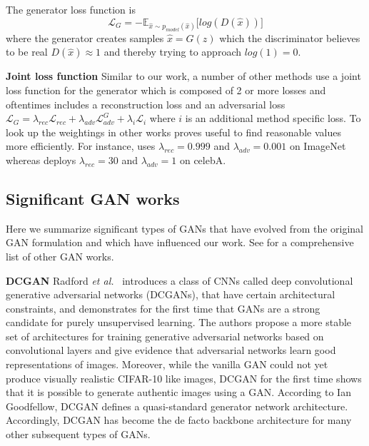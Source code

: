 \documentclass[a4paper,12pt]{report}
\begin{document}
The generator loss function is
\begin{equation} \label{eq:g_loss}
    \mathcal{L}_{G} = -\mathbb{E}_{\hat{x}\sim p_{model} (\hat{x})}\big[log(D(\hat{x}))\big]
\end{equation}
where the generator creates samples $\hat{x} = G(z)$ which the discriminator believes to be real $D(\hat{x}) \approx 1$ and thereby trying to approach $log(1) = 0$.

\par \textbf{Joint loss function}
Similar to our work, a number of other methods \cite{1511.05440,DisentFacOfVarByMixTh,1604.07379} use a joint loss function for the generator which is composed of 2 or more losses and oftentimes includes a reconstruction loss and an adversarial loss $\mathcal{L}_G = \lambda_{rec}\mathcal{L}_{rec} + \lambda_{adv}\mathcal{L}^G_{adv} + \lambda_{i}\mathcal{L}_{i}$ where $i$ is an additional method specific loss. To look up the weightings in other works proves useful to find reasonable values more efficiently. For instance, \cite{1604.07379} uses $\lambda_{rec} = 0.999$ and $\lambda_{adv} = 0.001$ on ImageNet whereas \cite{DisentFacOfVarByMixTh} deploys $\lambda_{rec} = 30$ and $\lambda_{adv} = 1$ on celebA.

\subsection{Significant GAN works}
Here we summarize significant types of GANs that have evolved from the original GAN formulation and which have influenced our work. See \cite{theGanZoo} for a comprehensive list of other GAN works.

\par \textbf{DCGAN} Radford \textit{et al.}~\cite{DCGAN} introduces a class of CNNs called deep convolutional generative adversarial networks (DCGANs), that have certain architectural constraints, and demonstrates for the first time that GANs are a strong candidate for purely unsupervised learning. The authors propose a more stable set of architectures for training generative adversarial networks based on convolutional layers and give evidence that adversarial networks learn good representations of images. Moreover, while the vanilla GAN could not yet produce visually realistic CIFAR-10 like images, DCGAN for the first time shows that it is possible to generate authentic images using a GAN. According to Ian Goodfellow, DCGAN defines a quasi-standard generator network architecture. Accordingly, DCGAN has become the de facto backbone architecture for many other subsequent types of GANs.
\end{document}
